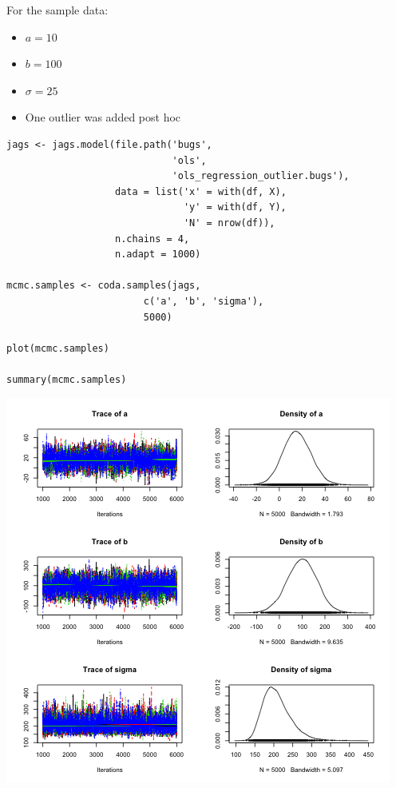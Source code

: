 \documentclass{beamer}
\begin{document}
\begin{frame}
  For the sample data:
  \begin{itemize}
    \item{$a = 10$}
    \item{$b = 100$}
    \item{$\sigma = 25$}
    \item{One outlier was added post hoc}
  \end{itemize}
\end{frame}

\begin{frame}[fragile]
  \begin{verbatim}
jags <- jags.model(file.path('bugs',
                             'ols',
                             'ols_regression_outlier.bugs'),
                   data = list('x' = with(df, X),
                               'y' = with(df, Y),
                               'N' = nrow(df)),
                   n.chains = 4,
                   n.adapt = 1000)
 
mcmc.samples <- coda.samples(jags,
                        c('a', 'b', 'sigma'),
                        5000)

plot(mcmc.samples)

summary(mcmc.samples)
  \end{verbatim}
\end{frame}

\begin{frame}[fragile]
  \begin{center}
    \includegraphics[scale = 0.4]{../graphs/ols/plot2.png}
  \end{center}
\end{frame}
\end{document}
